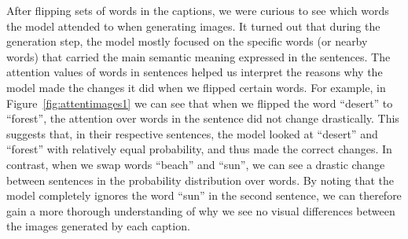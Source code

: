 \documentclass{article} %
\begin{document}
After flipping sets of words in the captions, we were curious to see which words the model attended to when generating images. It turned out that during the generation step, the model mostly focused on the specific words (or nearby words) that carried the main semantic meaning expressed in the sentences. The attention values of words in sentences helped us interpret the reasons why the model made the changes it did when we flipped certain words. For example, in Figure~\ref{fig:attentimages1} we can see that when we flipped the word ``desert'' to ``forest'', the attention over words in the sentence did not change drastically. This suggests that, in their respective sentences, the model looked at ``desert'' and ``forest'' with relatively equal probability, and thus made the correct changes. In contrast, when we swap words ``beach'' and ``sun'', we can see a drastic change between sentences in the probability distribution over words. By noting that the model completely ignores the word ``sun'' in the second sentence, we can therefore gain a more thorough understanding of why we see no visual differences between the images generated by each caption.
\end{document}
